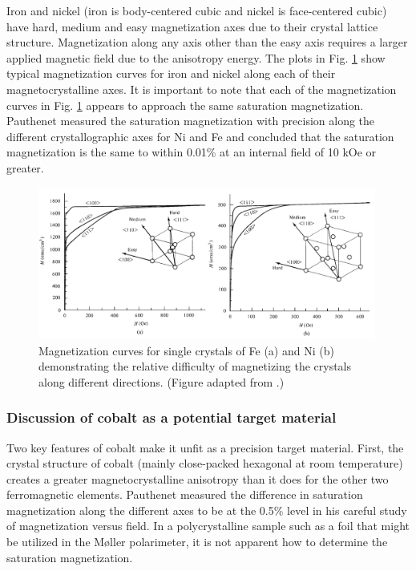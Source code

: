 \documentclass[preprint,12pt]{elsarticle}
\begin{document}

Iron and nickel (iron is body-centered cubic and nickel is face-centered cubic) have hard, medium and easy magnetization axes due to their crystal lattice structure. Magnetization along any axis other than the easy axis requires a larger applied magnetic field due to the anisotropy energy. The plots in Fig. \ref{fig:anisotropy_Ni_Fe} show typical magnetization curves for iron and nickel along each of their magnetocrystalline axes. It is important to note that each of the magnetization curves in Fig. \ref{fig:anisotropy_Ni_Fe} appears to approach the same saturation magnetization. Pauthenet measured the saturation magnetization with precision along the different crystallographic axes for Ni and Fe and concluded that the saturation magnetization is the same to within 0.01\% at an internal field of 10 kOe or greater\cite{PauthenetNov1982}.
\begin{figure}[ht]
\centering
\includegraphics[width=0.99\textwidth]{anisotropy_Ni_Fe_2.png}
\caption{Magnetization curves for single crystals of Fe (a) and Ni (b) demonstrating the relative difficulty of magnetizing the crystals along different directions. (Figure adapted from \cite{Cullity2008}.)}
\label{fig:anisotropy_Ni_Fe}
\end{figure}
\subsubsection{Discussion of cobalt as a potential target material}
Two key features of cobalt make it unfit as a precision target material. First, the crystal structure of cobalt (mainly close-packed hexagonal at room temperature) creates a greater magnetocrystalline anisotropy than it does for the other two ferromagnetic elements. Pauthenet measured the difference in saturation magnetization along the different axes to be at the 0.5\% level in his careful study of magnetization versus field\cite{PauthenetNov1982}. In a polycrystalline sample such as a foil that might be utilized in the M\o ller polarimeter, it is not apparent how to determine the saturation magnetization. 
\end{document}
